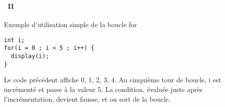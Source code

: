 \begin{frame}[containsverbatim]
  \frametitle{\secname}
  \framesubtitle{\subsecname~II}

  \begin{exampleblock}{Exemple d'utilisation simple de la boucle for}
    \begin{verbatim}
int i;
for(i = 0 ; i < 5 ; i++) {
  display(i);
}\end{verbatim}
  \end{exampleblock}
  \vspace{0.5cm}
  \par
  Le code précédent affiche 0, 1, 2, 3, 4. Au cinquième tour de boucle, i est incrémenté et passe à la valeur 5. La condition, évaluée juste après l'incrémentation, 
  devient fausse, et on sort de la boucle.
\end{frame}

